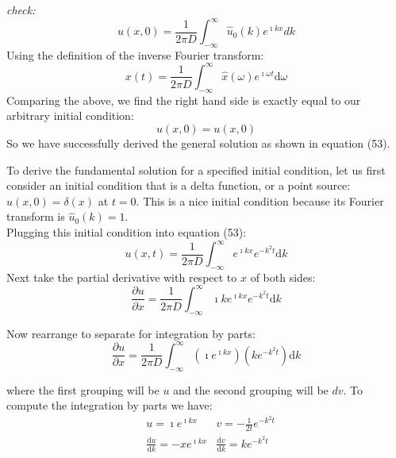 \documentclass[draft, jgrga]{AGUTeX}
\begin{document}
\begin{article}
\textit{check:}
\begin{equation}
u(x,0) = \frac{1}{2 \pi D} \int^\infty_{-\infty} \hat{u}_0 (k) e^{\imath kx} dk \nonumber
\end{equation}
Using the definition of the inverse Fourier transform:
\begin{equation}
x(t) = \frac{1}{2 \pi D} \int^\infty_{-\infty} \hat{x} (\omega) e^{\imath \omega t} \mathrm{d}\omega \nonumber
\end{equation}
Comparing the above, we find the right hand side is exactly equal to our arbitrary initial condition:
\begin{equation}
u(x,0) = u(x,0) \nonumber
\end{equation}
So we have successfully derived the general solution as shown in equation (53).

To derive the fundamental solution for a specified initial condition, let us first consider an initial condition that is a delta function, or a point source: \begin{math} u(x,0) = \delta (x) \end{math} at \begin{math} t=0 \end{math}. This is a nice initial condition because its Fourier transform is \begin{math} \hat{u}_0 (k) = 1 \end{math}.\\
Plugging this initial condition into equation (53):
\begin{equation}
u(x,t) = \frac{1}{2 \pi D} \int^\infty_{-\infty} e^{\imath kx} e^{-k^2t} \mathrm{d}k
\end{equation}
Next take the partial derivative with respect to $x$ of both sides:
\begin{equation}
\frac{\partial u}{\partial x} = \frac {1}{2 \pi D}
\int^\infty_{-\infty} \imath k e^{\imath kx} e^{-k^2t} \mathrm{d}k
\end{equation}

Now rearrange to separate for integration by parts:
\begin{equation}
\frac{\partial u}{\partial x} = \frac {1}{2 \pi D}
\int^\infty_{-\infty} \left( \imath e^{\imath kx} \right) \left(k e^{-k^2t} \right) \mathrm{d}k
\end{equation}

where the first grouping will be \begin{math} u \end{math} and the second grouping will be \begin{math} dv \end{math}. To compute the integration by parts we have:
\begin{eqnarray}
& u = \imath e^{\imath kx} & v=-\frac{1}{2t} e^{-k^2t} \nonumber \\
& \frac{\mathrm{d}u}{\mathrm{d}k} = - xe^{\imath kx} & \frac{\mathrm{d}v}{\mathrm{d}k} = k e^{-k^2t} \nonumber
\end{eqnarray}


\end{article}
\end{document}
